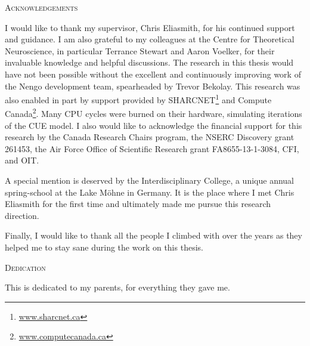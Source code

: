 \cleardoublepage


\begin{center}\textsc{Acknowledgements}\end{center}
I would like to thank my supervisor, Chris Eliasmith, for his continued support and guidance.
I am also grateful to my colleagues at the Centre for Theoretical Neuroscience, in particular Terrance Stewart and Aaron Voelker, for their invaluable knowledge and helpful discussions.
The research in this thesis would have not been possible without the excellent and continuously improving work of the Nengo development team, spearheaded by Trevor Bekolay.
This research was also enabled in part by support provided by SHARCNET\footnote{\href{https://www.sharcnet.ca}{www.sharcnet.ca}} and Compute Canada\footnote{\href{https://www.computecanada.ca}{www.computecanada.ca}}.
Many CPU cycles were burned on their hardware, simulating iterations of the CUE model.
I also would like to acknowledge the financial support for this research by the Canada Research Chairs program, the NSERC Discovery grant 261453, the Air Force Office of Scientific Research grant FA8655-13-1-3084, CFI, and OIT\@.  %

A special mention is deserved by the Interdisciplinary College, a unique annual spring-school at the Lake Möhne in Germany.
It is the place where I met Chris Eliasmith for the first time and ultimately made me pursue this research direction.

Finally, I would like to thank all the people I climbed with over the years as they helped me to stay sane during the work on this thesis.


\cleardoublepage


\begin{center}\textsc{Dedication}\end{center}

This is dedicated to my parents, for everything they gave me.

\cleardoublepage

\renewcommand\contentsname{Table of Contents}
\tableofcontents
\cleardoublepage

\listoftables
\cleardoublepage

\listoffigures
\cleardoublepage

\printglossaries
\cleardoublepage

\pagestyle{headings}
